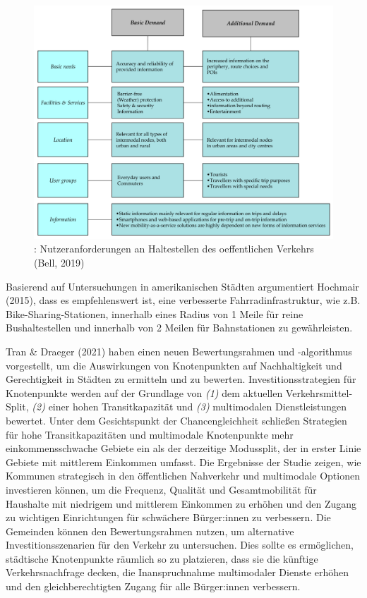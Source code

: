 \documentclass[
]{book}
\begin{document}
\begin{figure}
\includegraphics[width=0.65\linewidth]{image/mobility_hubs} \caption{: Nutzeranforderungen an Haltestellen des oeffentlichen Verkehrs (Bell, 2019)}\label{fig:unnamed-chunk-32}
\end{figure}

Basierend auf Untersuchungen in amerikanischen Städten argumentiert Hochmair (2015), dass es empfehlenswert ist, eine verbesserte Fahrradinfrastruktur, wie z.B. Bike-Sharing-Stationen, innerhalb eines Radius von 1 Meile für reine Bushaltestellen und innerhalb von 2 Meilen für Bahnstationen zu gewährleisten.

Tran \& Draeger (2021) haben einen neuen Bewertungsrahmen und -algorithmus vorgestellt, um die Auswirkungen von Knotenpunkten auf Nachhaltigkeit und Gerechtigkeit in Städten zu ermitteln und zu bewerten. Investitionsstrategien für Knotenpunkte werden auf der Grundlage von \emph{(1)} dem aktuellen Verkehrsmittel-Split, \emph{(2)} einer hohen Transitkapazität und \emph{(3)} multimodalen Dienstleistungen bewertet. Unter dem Gesichtspunkt der Chancengleichheit schließen Strategien für hohe Transitkapazitäten und multimodale Knotenpunkte mehr einkommensschwache Gebiete ein als der derzeitige Modussplit, der in erster Linie Gebiete mit mittlerem Einkommen umfasst. Die Ergebnisse der Studie zeigen, wie Kommunen strategisch in den öffentlichen Nahverkehr und multimodale Optionen investieren können, um die Frequenz, Qualität und Gesamtmobilität für Haushalte mit niedrigem und mittlerem Einkommen zu erhöhen und den Zugang zu wichtigen Einrichtungen für schwächere Bürger:innen zu verbessern. Die Gemeinden können den Bewertungsrahmen nutzen, um alternative Investitionsszenarien für den Verkehr zu untersuchen. Dies sollte es ermöglichen, städtische Knotenpunkte räumlich so zu platzieren, dass sie die künftige Verkehrsnachfrage decken, die Inanspruchnahme multimodaler Dienste erhöhen und den gleichberechtigten Zugang für alle Bürger:innen verbessern.
\end{document}
